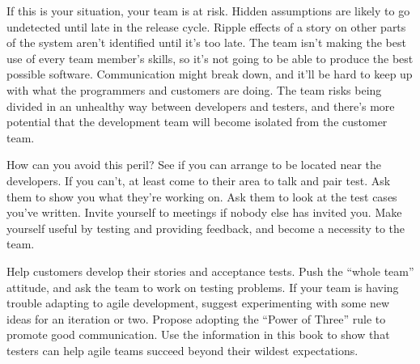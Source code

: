\documentclass[
	12pt,				%
	openright,			%
	oneside,			%
	a4paper,			%
	english,			%
	brazil,				%
	]{abntex2}
\begin{document}
If this is your situation, your team is at risk. Hidden assumptions are likely to go undetected until late in the release cycle. Ripple effects of a story on other parts of the system aren’t identified until it’s too late. The team isn’t making the best use of every team member’s skills, so it’s not going to be able to produce the best possible software. Communication might break down, and it’ll be hard to keep up with what the programmers and customers are doing. The team risks being divided in an unhealthy way between developers and testers, and there’s more potential that the development team will become isolated from the customer team.

How can you avoid this peril? See if you can arrange to be located near the developers. If you can’t, at least come to their area to talk and pair test. Ask them to show you what they’re working on. Ask them to look at the test cases you’ve written. Invite yourself to meetings if nobody else has invited you. Make yourself useful by testing and providing feedback, and become a necessity to the team.

Help customers develop their stories and acceptance tests. Push the “whole team” attitude, and ask the team to work on testing problems. If your team is having trouble adapting to agile development, suggest experimenting with some new ideas for an iteration or two. Propose adopting the “Power of Three” rule to promote good communication. Use the information in this book to show that testers can help agile teams succeed beyond their wildest expectations.
\end{document}
